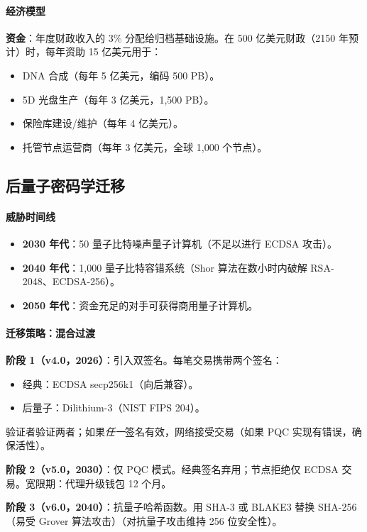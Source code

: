 \documentclass[11pt]{article}
\begin{document}
\paragraph{经济模型}
\textbf{资金}：年度财政收入的 3\% 分配给归档基础设施。在 500 亿美元财政（2150 年预计）时，每年资助 15 亿美元用于：
\begin{itemize}[noitemsep]
  \item DNA 合成（每年 5 亿美元，编码 500 PB）。
  \item 5D 光盘生产（每年 3 亿美元，1,500 PB）。
  \item 保险库建设/维护（每年 4 亿美元）。
  \item 托管节点运营商（每年 3 亿美元，全球 1,000 个节点）。
\end{itemize}

\subsection{后量子密码学迁移}

\paragraph{威胁时间线}
\begin{itemize}[noitemsep]
  \item \textbf{2030 年代}：50 量子比特噪声量子计算机（不足以进行 ECDSA 攻击）。
  \item \textbf{2040 年代}：1,000 量子比特容错系统（Shor 算法在数小时内破解 RSA-2048、ECDSA-256）。
  \item \textbf{2050 年代}：资金充足的对手可获得商用量子计算机。
\end{itemize}

\paragraph{迁移策略：混合过渡}
\textbf{阶段 1（v4.0，2026）}：引入双签名。每笔交易携带两个签名：
\begin{itemize}[noitemsep]
  \item 经典：ECDSA secp256k1（向后兼容）。
  \item 后量子：Dilithium-3（NIST FIPS 204）。
\end{itemize}
验证者验证两者；如果\emph{任一}签名有效，网络接受交易（如果 PQC 实现有错误，确保活性）。

\textbf{阶段 2（v5.0，2030）}：仅 PQC 模式。经典签名弃用；节点拒绝仅 ECDSA 交易。宽限期：代理升级钱包 12 个月。

\textbf{阶段 3（v6.0，2040）}：抗量子哈希函数。用 SHA-3 或 BLAKE3 替换 SHA-256（易受 Grover 算法攻击）（对抗量子攻击维持 256 位安全性）。
\end{document}

